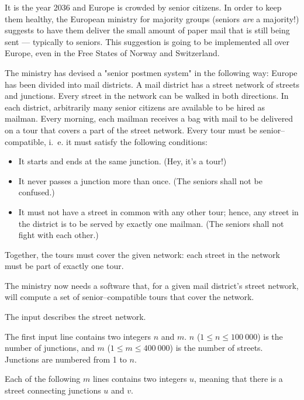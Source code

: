 \documentclass{boi2014}
\begin{document}
    It is the year 2036 and Europe is crowded by senior citizens. In order to
    keep them healthy, the European ministry for majority groups (seniors
    \emph{are} a majority!) suggests to have them deliver the small amount of
    paper mail that is still being sent --- typically to seniors. This
    suggestion is going to be implemented all over Europe, even in the Free
    States of Norway and Switzerland.

    The ministry has devised a "senior postmen system" in the following way:
    Europe has been divided into mail districts. A mail district has a street
    network of streets and junctions. Every street in the network can be walked
    in both directions. In each district, arbitrarily many senior citizens are
    available to be hired as mailman. Every morning, each mailman receives a bag
    with mail to be delivered on a tour that covers a part of the street
    network. Every tour must be senior--compatible, i.~e. it must satisfy the
    following conditions:

    \begin{itemize}
        \item It starts and ends at the same junction. (Hey, it’s a tour!)
        \item It never passes a junction more than once. (The seniors shall not
        be confused.)
        \item It must not have a street in common with any other tour; hence,
        any street in the district is to be served by exactly one mailman. (The
        seniors shall not fight with each other.)
    \end{itemize}

    Together, the tours must cover the given network: each street in the network
    must be part of exactly one tour.

    \Task
    The ministry now needs a software that, for a given mail district’s street
    network, will compute a set of senior--compatible tours that cover the
    network.

    \Input
    The input describes the street network.

    The first input line contains two integers $n$ and $m$.  $n$ ($1 \le n \le
    100\ 000$) is the number of junctions, and $m$ ($1 \le m \le 400\ 000$) is
    the number of streets. Junctions are numbered from 1 to $n$.

    Each of the following $m$ lines contains two integers $u$, meaning that
    there is a street connecting junctions $u$ and $v$.
\end{document}
